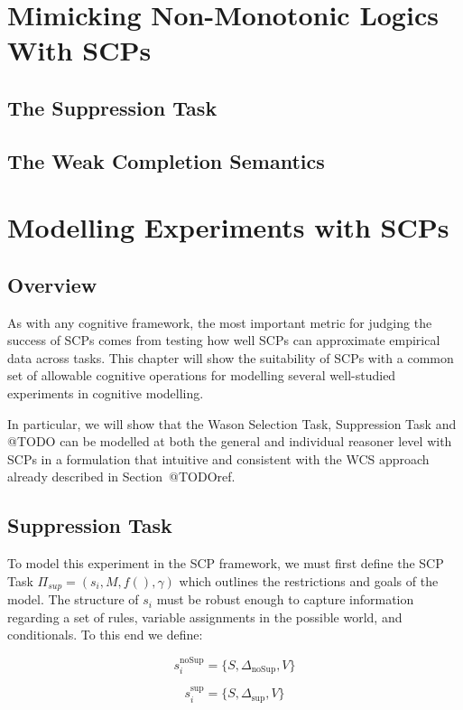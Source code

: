 \chapter{Mimicking Non-Monotonic Logics With SCPs} \label{chp:mimick}

\section{The Suppression Task}

\section{The Weak Completion Semantics}



\chapter{Modelling Experiments with SCPs} \label{chp:model}
\section{Overview}
As with any cognitive framework, the most important metric for judging the success of SCPs comes from testing how well SCPs can approximate empirical data across tasks. This chapter will show the suitability of SCPs with a common set of allowable cognitive operations for modelling several well-studied experiments in cognitive modelling.

In particular, we will show that the Wason Selection Task, Suppression Task and @TODO can be modelled at both the general and individual reasoner level with SCPs in a formulation that intuitive and consistent with the WCS approach already described in Section~@TODOref.
\section{Suppression Task}



To model this experiment in the SCP framework, we must first define the SCP Task $\Pi_{sup}=(s_i,M,f(),\gamma)$ which outlines the restrictions and goals of the model. The structure of $s_i$ must be robust enough to capture information regarding a set of rules, variable assignments in the possible world, and conditionals. To this end we define:

\[s_i^\text{noSup}=\{S,\Delta_\text{noSup}, V\} \]

\[s_i^\text{sup}=\{S,\Delta_\text{sup}, V\} \]

